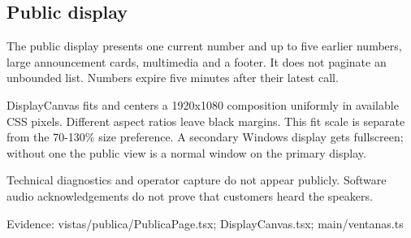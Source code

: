 \subsection{Public display}

The public display presents one current number and up to five earlier numbers, large announcement cards, multimedia and a footer. It does not paginate an unbounded list. Numbers expire five minutes after their latest call.

DisplayCanvas fits and centers a 1920x1080 composition uniformly in available CSS pixels. Different aspect ratios leave black margins. This fit scale is separate from the 70-130\% size preference. A secondary Windows display gets fullscreen; without one the public view is a normal window on the primary display.

Technical diagnostics and operator capture do not appear publicly. Software audio acknowledgements do not prove that customers heard the speakers.

Evidence: vistas/publica/PublicaPage.tsx; DisplayCanvas.tsx; main/ventanas.ts
